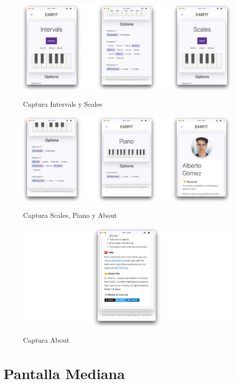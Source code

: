 \documentclass[12pt,twoside,titlepage]{report}
\begin{document}
{\begin{figure}[H]
    \centering
    \includegraphics[scale=0.7]{Capturas Earfit/Movil/Movil2}
    \label{fig:Movil2}
    \caption{Captura Intervals y Scales}
\end{figure}

\begin{figure}[H]
    \centering
    \includegraphics[scale=0.7]{Capturas Earfit/Movil/Movil3}
    \label{fig:Movil3}
    \caption{Captura Scales, Piano y About}
\end{figure}

\begin{figure}[H]
    \centering
    \includegraphics[scale=0.7]{Capturas Earfit/Movil/Movil4}
    \label{fig:Movil4}
    \caption{Captura About}
\end{figure}

\section{Pantalla Mediana}

}
\end{document}

